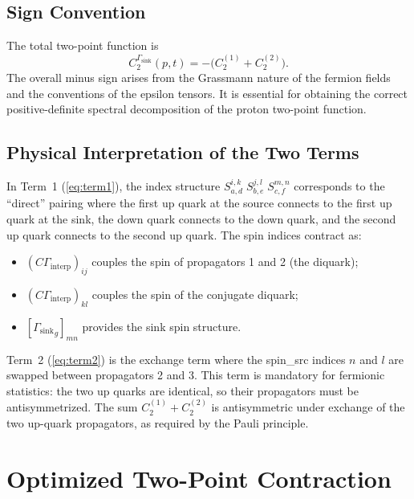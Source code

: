 \documentclass[11pt,a4paper]{article}
\newcommand{\Gint}{\Gamma_{\text{interp}}}
\newcommand{\Gsink}{\Gamma_{\text{sink}}}
\newcommand{\Cmat}{C}
\newcommand{\fwprop}{S}
\begin{document}
\subsection{Sign Convention}

The total two-point function is
\begin{equation}
  \boxed{
  C_{2}^{\Gsink}(p,t) = -\big(C_{2}^{(1)} + C_{2}^{(2)}\big).
  }
  \label{eq:C2_sign}
\end{equation}
The overall minus sign arises from the Grassmann nature of the fermion fields and
the conventions of the epsilon tensors.  It is essential for obtaining the
correct positive-definite spectral decomposition of the proton two-point function.

\subsection{Physical Interpretation of the Two Terms}

In Term~1 (\ref{eq:term1}), the index structure
$\fwprop^{i,k}_{a,d}\;\fwprop^{j,l}_{b,e}\;\fwprop^{m,n}_{c,f}$ corresponds to the
``direct'' pairing where the first up quark at the source connects to the first up
quark at the sink, the down quark connects to the down quark, and the second up
quark connects to the second up quark.  The spin indices contract as:
\begin{itemize}
  \item $(\Cmat\Gint)_{ij}$ couples the spin of propagators 1 and 2 (the diquark);
  \item $(\Cmat\Gint)_{kl}$ couples the spin of the conjugate diquark;
  \item $[{\Gsink}_{g}]_{mn}$ provides the sink spin structure.
\end{itemize}

Term~2 (\ref{eq:term2}) is the exchange term where the spin\_src indices $n$ and
$l$ are swapped between propagators 2 and 3.  This term is mandatory for fermionic
statistics: the two up quarks are identical, so their propagators must be
antisymmetrized.  The sum $C_{2}^{(1)}+C_{2}^{(2)}$ is antisymmetric under exchange
of the two up-quark propagators, as required by the Pauli principle.

\section{Optimized Two-Point Contraction}
\end{document}
